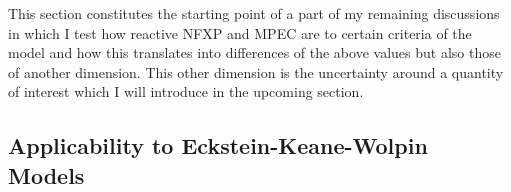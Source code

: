 This section constitutes the starting point of a part of my remaining discussions in which I test how reactive NFXP and MPEC are to certain criteria of the model and how this translates into differences of the above values but also those of another dimension. This other dimension is the uncertainty around a quantity of interest which I will introduce in the upcoming section.

\subsection{Applicability to Eckstein-Keane-Wolpin Models}